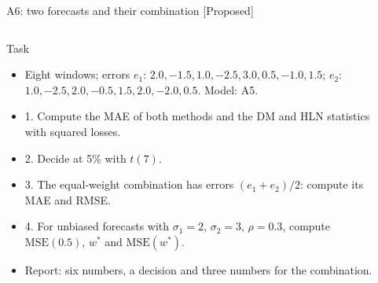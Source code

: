\begin{frame}{A6: two forecasts and their combination [Proposed]}
\propsub
\itemsize{\scriptsize}
\begin{columns}[T]
\begin{column}{\taskw}
\begin{block}{Task}
\begin{itemize}
    \item Eight windows; errors $e_1$: $2.0, -1.5, 1.0, -2.5, 3.0, 0.5, -1.0, 1.5$; $e_2$: $1.0, -2.5, 2.0, -0.5, 1.5, 2.0, -2.0, 0.5$. Model: A5.
    \item 1. Compute the MAE of both methods and the DM and HLN statistics with squared losses.
    \item 2. Decide at 5\% with $t(7)$.
    \item 3. The equal-weight combination has errors $(e_1 + e_2)/2$: compute its MAE and RMSE.
    \item 4. For unbiased forecasts with $\sigma_1 = 2$, $\sigma_2 = 3$, $\rho = 0.3$, compute $\mathrm{MSE}(0.5)$, $w^*$ and $\mathrm{MSE}(w^*)$.
    \item Report: six numbers, a decision and three numbers for the combination.
\end{itemize}
\end{block}
\end{column}
\begin{column}{\solw}
\end{column}
\end{columns}
\end{frame}


